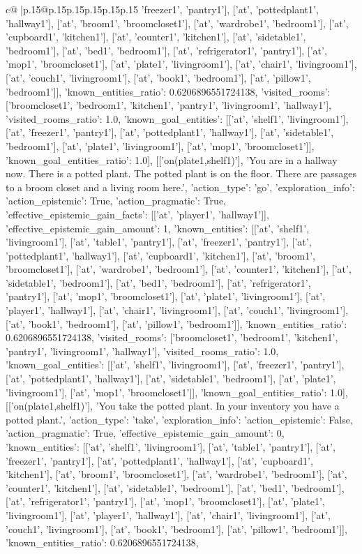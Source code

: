 \documentclass{article}
\begin{document}
{\begin{supertabular}{c@{$\;$}|p{.15\linewidth}@{}p{.15\linewidth}p{.15\linewidth}p{.15\linewidth}p{.15\linewidth}p{.15\linewidth}}
{{{'freezer1', 'pantry1'], ['at', 'pottedplant1', 'hallway1'], ['at', 'broom1', 'broomcloset1'], ['at', 'wardrobe1', 'bedroom1'], ['at', 'cupboard1', 'kitchen1'], ['at', 'counter1', 'kitchen1'], ['at', 'sidetable1', 'bedroom1'], ['at', 'bed1', 'bedroom1'], ['at', 'refrigerator1', 'pantry1'], ['at', 'mop1', 'broomcloset1'], ['at', 'plate1', 'livingroom1'], ['at', 'chair1', 'livingroom1'], ['at', 'couch1', 'livingroom1'], ['at', 'book1', 'bedroom1'], ['at', 'pillow1', 'bedroom1']], 'known_entities_ratio': 0.6206896551724138, 'visited_rooms': ['broomcloset1', 'bedroom1', 'kitchen1', 'pantry1', 'livingroom1', 'hallway1'], 'visited_rooms_ratio': 1.0, 'known_goal_entities': [['at', 'shelf1', 'livingroom1'], ['at', 'freezer1', 'pantry1'], ['at', 'pottedplant1', 'hallway1'], ['at', 'sidetable1', 'bedroom1'], ['at', 'plate1', 'livingroom1'], ['at', 'mop1', 'broomcloset1']], 'known_goal_entities_ratio': 1.0}}], [['on(plate1,shelf1)'], 'You are in a hallway now. There is a potted plant. The potted plant is on the floor. There are passages to a broom closet and a living room here.', {'action_type': 'go', 'exploration_info': {'action_epistemic': True, 'action_pragmatic': True, 'effective_epistemic_gain_facts': [['at', 'player1', 'hallway1']], 'effective_epistemic_gain_amount': 1, 'known_entities': [['at', 'shelf1', 'livingroom1'], ['at', 'table1', 'pantry1'], ['at', 'freezer1', 'pantry1'], ['at', 'pottedplant1', 'hallway1'], ['at', 'cupboard1', 'kitchen1'], ['at', 'broom1', 'broomcloset1'], ['at', 'wardrobe1', 'bedroom1'], ['at', 'counter1', 'kitchen1'], ['at', 'sidetable1', 'bedroom1'], ['at', 'bed1', 'bedroom1'], ['at', 'refrigerator1', 'pantry1'], ['at', 'mop1', 'broomcloset1'], ['at', 'plate1', 'livingroom1'], ['at', 'player1', 'hallway1'], ['at', 'chair1', 'livingroom1'], ['at', 'couch1', 'livingroom1'], ['at', 'book1', 'bedroom1'], ['at', 'pillow1', 'bedroom1']], 'known_entities_ratio': 0.6206896551724138, 'visited_rooms': ['broomcloset1', 'bedroom1', 'kitchen1', 'pantry1', 'livingroom1', 'hallway1'], 'visited_rooms_ratio': 1.0, 'known_goal_entities': [['at', 'shelf1', 'livingroom1'], ['at', 'freezer1', 'pantry1'], ['at', 'pottedplant1', 'hallway1'], ['at', 'sidetable1', 'bedroom1'], ['at', 'plate1', 'livingroom1'], ['at', 'mop1', 'broomcloset1']], 'known_goal_entities_ratio': 1.0}}], [['on(plate1,shelf1)'], 'You take the potted plant. In your inventory you have a potted plant.', {'action_type': 'take', 'exploration_info': {'action_epistemic': False, 'action_pragmatic': True, 'effective_epistemic_gain_amount': 0, 'known_entities': [['at', 'shelf1', 'livingroom1'], ['at', 'table1', 'pantry1'], ['at', 'freezer1', 'pantry1'], ['at', 'pottedplant1', 'hallway1'], ['at', 'cupboard1', 'kitchen1'], ['at', 'broom1', 'broomcloset1'], ['at', 'wardrobe1', 'bedroom1'], ['at', 'counter1', 'kitchen1'], ['at', 'sidetable1', 'bedroom1'], ['at', 'bed1', 'bedroom1'], ['at', 'refrigerator1', 'pantry1'], ['at', 'mop1', 'broomcloset1'], ['at', 'plate1', 'livingroom1'], ['at', 'player1', 'hallway1'], ['at', 'chair1', 'livingroom1'], ['at', 'couch1', 'livingroom1'], ['at', 'book1', 'bedroom1'], ['at', 'pillow1', 'bedroom1']], 'known_entities_ratio': 0.6206896551724138, }}}
\end{supertabular}}
\end{document}
